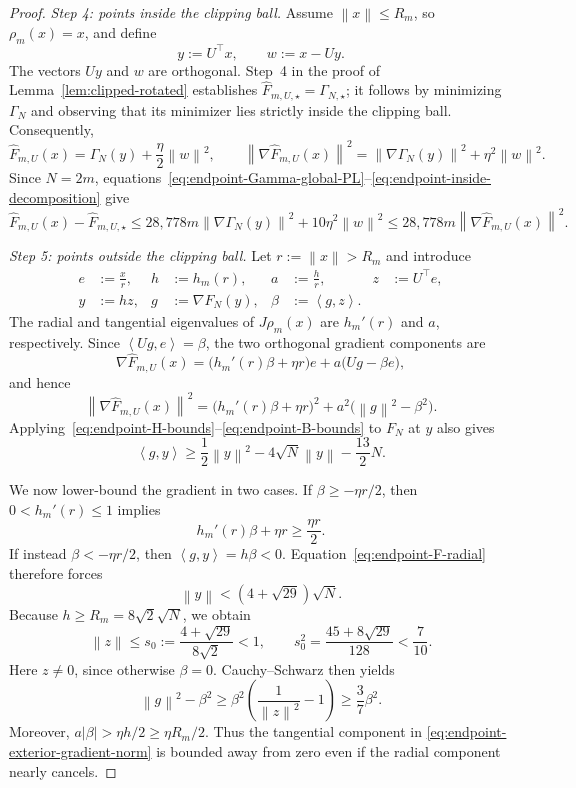 \documentclass[11pt]{article}
\newcommand{\norm}[1]{\left\lVert #1\right\rVert}
\newcommand{\ip}[2]{\left\langle #1,#2\right\rangle}
\begin{document}
\begin{proof}
\emph{Step 4: points inside the clipping ball.}
Assume $\norm{x}\le R_m$, so $\rho_m(x)=x$, and define
\[
y:=U^\top x,
\qquad
w:=x-Uy.
\]
The vectors $Uy$ and $w$ are orthogonal. Step~4 in the proof of Lemma~\ref{lem:clipped-rotated} establishes
$\widehat F_{m,U,\star}=\Gamma_{N,\star}$; it follows by minimizing $\Gamma_N$ and observing that its minimizer lies
strictly inside the clipping ball. Consequently,
\begin{equation}
\label{eq:endpoint-inside-decomposition}
\widehat F_{m,U}(x)
=\Gamma_N(y)+\frac{\eta}{2}\norm{w}^2,
\qquad
\norm{\nabla\widehat F_{m,U}(x)}^2
=\norm{\nabla\Gamma_N(y)}^2+\eta^2\norm{w}^2.
\end{equation}
Since $N=2m$, equations~\eqref{eq:endpoint-Gamma-global-PL}--\eqref{eq:endpoint-inside-decomposition} give
\[
\widehat F_{m,U}(x)-\widehat F_{m,U,\star}
\le
28{,}778m\norm{\nabla\Gamma_N(y)}^2+10\eta^2\norm{w}^2
\le
28{,}778m\norm{\nabla\widehat F_{m,U}(x)}^2.
\]

\emph{Step 5: points outside the clipping ball.}
Let $r:=\norm{x}>R_m$ and introduce
\begin{align*}
e&:=\frac{x}{r},
&
h&:=h_m(r),
&
a&:=\frac{h}{r},
&
z&:=U^\top e,\\
y&:=hz,
&
g&:=\nabla F_N(y),
&
\beta&:=\ip{g}{z}.
\end{align*}
The radial and tangential eigenvalues of $J\rho_m(x)$ are $h_m'(r)$ and $a$, respectively. Since
$\ip{Ug}{e}=\beta$, the two orthogonal gradient components are
\begin{equation}
\label{eq:endpoint-exterior-gradient}
\nabla\widehat F_{m,U}(x)
=
\bigl(h_m'(r)\beta+\eta r\bigr)e
+a\bigl(Ug-\beta e\bigr),
\end{equation}
and hence
\begin{equation}
\label{eq:endpoint-exterior-gradient-norm}
\norm{\nabla\widehat F_{m,U}(x)}^2
=
\bigl(h_m'(r)\beta+\eta r\bigr)^2
+a^2\bigl(\norm{g}^2-\beta^2\bigr).
\end{equation}
Applying~\eqref{eq:endpoint-H-bounds}--\eqref{eq:endpoint-B-bounds} to $F_N$ at $y$ also gives
\begin{equation}
\label{eq:endpoint-F-radial}
\ip{g}{y}
\ge
\frac12\norm{y}^2-4\sqrt N\norm{y}-\frac{13}{2}N.
\end{equation}

We now lower-bound the gradient in two cases. If $\beta\ge-\eta r/2$, then $0<h_m'(r)\le1$ implies
\[
h_m'(r)\beta+\eta r\ge\frac{\eta r}{2}.
\]
If instead $\beta<-\eta r/2$, then $\ip{g}{y}=h\beta<0$. Equation~\eqref{eq:endpoint-F-radial} therefore forces
\[
\norm{y}<(4+\sqrt{29})\sqrt N.
\]
Because $h\ge R_m=8\sqrt2\sqrt N$, we obtain
\[
\norm{z}\le s_0:=\frac{4+\sqrt{29}}{8\sqrt2}<1,
\qquad
s_0^2=\frac{45+8\sqrt{29}}{128}<\frac{7}{10}.
\]
Here $z\ne0$, since otherwise $\beta=0$. Cauchy--Schwarz then yields
\[
\norm{g}^2-\beta^2
\ge
\beta^2\left(\frac{1}{\norm{z}^2}-1\right)
\ge
\frac{3}{7}\beta^2.
\]
Moreover, $a|\beta|>\eta h/2\ge\eta R_m/2$. Thus the tangential component in
\eqref{eq:endpoint-exterior-gradient-norm} is bounded away from zero even if the radial component nearly cancels.


\end{proof}
\end{document}
